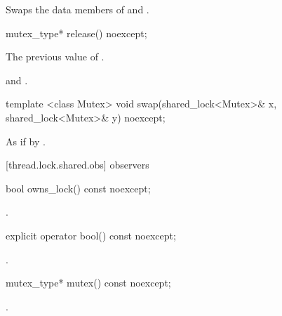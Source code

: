 \begin{itemdescr}
\pnum
\effects Swaps the data members of  and .
\end{itemdescr}

%
\begin{itemdecl}
mutex_type* release() noexcept;
\end{itemdecl}

\begin{itemdescr}
\pnum
\returns The previous value of .

\pnum
\postconditions {} and .
\end{itemdescr}

%
\begin{itemdecl}
template <class Mutex>
  void swap(shared_lock<Mutex>& x, shared_lock<Mutex>& y) noexcept;
\end{itemdecl}

\begin{itemdescr}
\pnum
\effects As if by .
\end{itemdescr}

[thread.lock.shared.obs]{ observers}

%
\begin{itemdecl}
bool owns_lock() const noexcept;
\end{itemdecl}

\begin{itemdescr}
\pnum
\returns {}.
\end{itemdescr}

%
\begin{itemdecl}
explicit operator bool() const noexcept;
\end{itemdecl}

\begin{itemdescr}
\pnum
\returns {}.
\end{itemdescr}

%
\begin{itemdecl}
mutex_type* mutex() const noexcept;
\end{itemdecl}

\begin{itemdescr}
\pnum
\returns {}.
\end{itemdescr}

